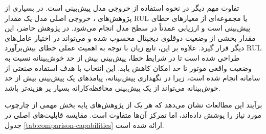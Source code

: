 تفاوت مهم دیگر در نحوه استفاده از خروجی مدل پیش‌بینی است. در بسیاری
از پژوهش‌های ، خروجی اصلی مدل یک مقدار \gls{RUL} یا مجموعه‌ای از
معیارهای خطای پیش‌بینی است و ارزیابی عمدتاً در سطح مدل انجام می‌شود.
در پژوهش حاضر، این مقدار بخشی از وضعیت دوقلوی دیجیتال محسوب شده و
می‌تواند در اختیار عامل‌های دیگر قرار گیرد. علاوه بر این، تابع زیان
با توجه به اهمیت عملی خطای بیش‌برآورد \gls{RUL} طراحی شده است تا در شرایط
خطا، پیش‌بینی بیش از حد خوش‌بینانه نسبت به وضعیت واقعی موتور تا حد
امکان کاهش یابد. این انتخاب با هدف استفاده صنعتی از سامانه انجام شده
است، زیرا در نگهداری پیش‌بینانه، پیامدهای یک پیش‌بینی بیش از حد
خوش‌بینانه می‌تواند از یک پیش‌بینی محافظه‌کارانه بسیار پر هزینه‌‌تر باشد.

برآیند این مطالعات نشان می‌دهد که هر یک از پژوهش‌های پایه بخش مهمی
از چارچوب مورد نیاز را پوشش داده‌اند، اما تمرکز آن‌ها متفاوت است.
مقایسه قابلیت‌های اصلی در جدول \ref{tab:comparison-capabilities}
ارائه شده است.

